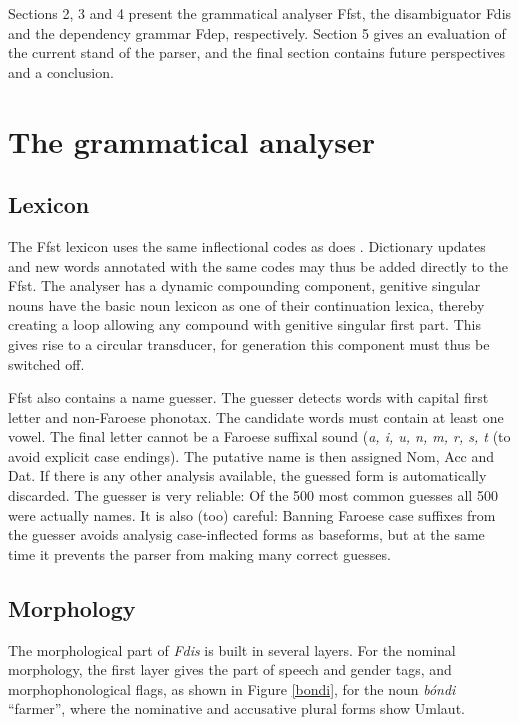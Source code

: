 \documentclass[11pt]{article}
\begin{document}
Sections 2, 3 and 4 present the grammatical analyser Ffst, the disambiguator Fdis and the dependency grammar Fdep, respectively. Section 5 gives an evaluation of the current stand of the parser, and the final section contains future perspectives and a conclusion.

\section{The grammatical analyser}

\subsection{Lexicon}

The Ffst lexicon uses the same inflectional codes as does \cite{Poulsen98}.  Dictionary updates and new words annotated with the same codes may thus be added directly to the Ffst. The analyser has a dynamic compounding component, genitive singular nouns have the basic noun lexicon as one of their continuation lexica, thereby creating a loop allowing any compound with genitive singular first part. This gives rise to a circular transducer, for generation this component must thus be switched off.

Ffst also contains a name guesser. The guesser detects words with capital first letter and non-Faroese phonotax. The candidate words must contain at least one vowel. The final letter cannot be a Faroese suffixal sound (\textit{a, i, u, n, m, r, s, t} (to avoid explicit case endings). The putative name is then assigned Nom, Acc and Dat. If there is any other analysis available, the guessed form is automatically discarded. The guesser is very reliable: Of the 500 most common guesses all 500 were actually names. It is also (too) careful: Banning Faroese case suffixes from the guesser avoids analysig case-inflected forms as baseforms, but at the same time it prevents the parser from making many correct guesses. 


\subsection{Morphology}

The morphological part of \textit{Fdis} is built in several layers. For the nominal morphology, the first layer gives the part of speech and gender tags, and morphophonological flags, as shown in Figure \ref{bondi}, for the noun \textit{bóndi} “farmer”, where the nominative and accusative plural forms show Umlaut.
\end{document}
